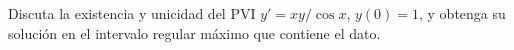 Discuta la existencia y unicidad del PVI $y'=xy/\cos x$, $y(0)=1$, y obtenga su solución en el intervalo regular máximo que contiene el dato.
